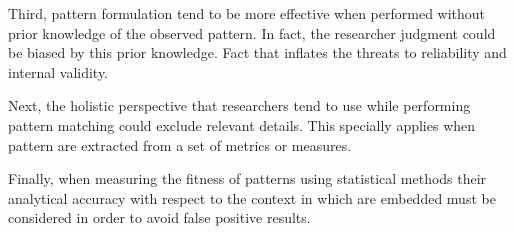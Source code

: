 Third, pattern formulation tend to be more effective when performed without prior knowledge of the observed pattern. In fact, the researcher judgment could be biased by this prior knowledge. Fact that inflates the threats to reliability and internal validity.

Next, the holistic perspective that researchers tend to use while performing pattern matching could exclude relevant details. This specially applies when pattern are extracted from a set of metrics or measures.

Finally, when measuring the fitness of patterns using statistical methods their analytical accuracy with respect to the context in which are embedded must be considered in order to avoid false positive results.


